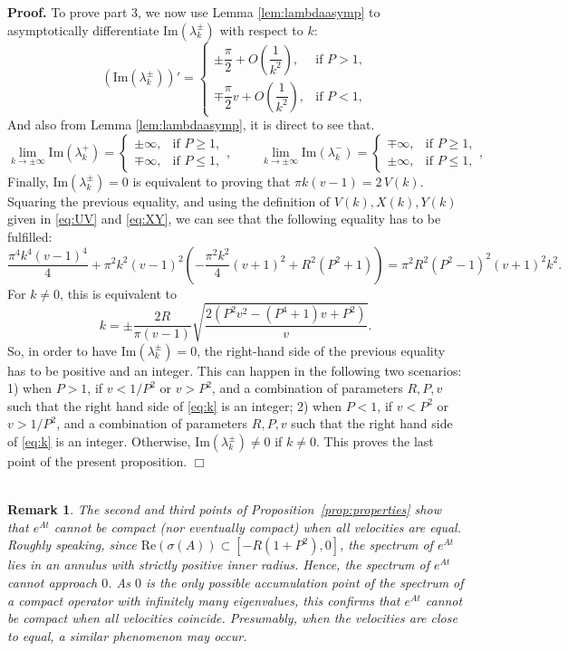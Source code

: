 \documentclass[a4paper]{article}
\newtheorem{rem}[thm]{Remark}
\def\Re{{\textrm{Re}}}
\def\Im{{\textrm{Im}}}
\numberwithin{equation}{section}
\newenvironment{pf}{\vspace{0.5em}\noindent\textbf{Proof.} }{\quad \hfill $\Box$ \\ \vspace{0.2em}\\}
\begin{document}
\begin{pf}
To prove part 3, we now use Lemma \ref{lem:lambdaasymp} to asymptotically differentiate $\Im(\lambda_k^{\pm})$ with respect to $k$:
\[
\left(\Im(\lambda_k^{\pm})\right)' = \begin{cases}
 \pm \dfrac{\pi}{2} + O\left(\dfrac{1}{k^2}\right), & \text{if } P > 1, \\[6pt]
 \mp \dfrac{\pi}{2}v+ O\left(\dfrac{1}{k^2}\right), & \text{if } P < 1 ,
 \end{cases}
\]
And also from Lemma \ref{lem:lambdaasymp}, it is direct to see that.
\[
\lim_{k\to\pm\infty} \Im(\lambda_k^+)
=\begin{cases}
 \pm \infty, & \text{if } P \geq 1, \\[6pt]
 \mp \infty, & \text{if } P \leq 1 ,
\end{cases},\qquad \
\lim_{k\to\pm\infty} \Im(\lambda_k^-)
=\begin{cases}
 \mp \infty, & \text{if } P \geq 1, \\[6pt]
 \pm \infty, & \text{if } P \leq 1 ,
\end{cases},
\]
Finally, $\Im(\lambda_k^{\pm})=0$ is equivalent to proving that $\pi k (v-1)=2\,V(k)$. Squaring the previous equality, and using the definition of $V(k),X(k),Y(k)$ given in \eqref{eq:UV} and \eqref{eq:XY}, we can see that the following equality has to be fulfilled:
$$\frac{\pi^4 k^4(v-1)^4}{4}+ \pi^2 k^2 (v-1)^2 \left( -\frac{\pi^2 k^2}{4}(v+1)^2 + R^2 (P^2+1)\right)= \pi^2 R^2 (P^2-1)^2 (v+1)^2 k^2.
$$
For $k\neq 0$, this is equivalent to
\begin{equation}\label{eq:k}
k = \pm\dfrac{2R}{\pi (v-1)}\sqrt{\dfrac{2  \left( P^2v^2-(P^4+1)v +P^2 \right)}{ v }}.
\end{equation}
So, in order to have $\Im(\lambda_k^{\pm})=0$, the right-hand side of the previous equality has to be positive and an integer. This can happen in the following two scenarios: 1) when $P>1$, if $v<1/P^2$ or $v>P^2$, and a combination of parameters $R,P,v$ such that the right hand side of \eqref{eq:k} is an integer; 2) when $P<1$, if $v<P^2$ or $v>1/P^2$, and a combination of parameters $R,P,v$ such that the right hand side of \eqref{eq:k} is an integer. Otherwise, $\Im(\lambda_k^{\pm})\neq 0$ if $k\neq 0$. This proves the last point of the present proposition.
\end{pf}
\begin{rem}\label{rem:compact}
The second and third points of Proposition~\ref{prop:properties} show that $e^{At}$ cannot be compact (nor eventually compact) when all velocities are equal. Roughly speaking, since $\Re(\sigma(A)) \subset [-R(1+P^2),0]$, the spectrum of $e^{At}$ lies in an annulus with strictly positive inner radius. Hence, the spectrum of $e^{At}$ cannot approach $0$. As $0$ is the only possible accumulation point of the spectrum of a compact operator with infinitely many eigenvalues, this confirms that $e^{At}$ cannot be compact when all velocities coincide. Presumably, when the velocities are \textsl{close to equal}, a similar phenomenon may occur.
\end{rem}
\end{document}
